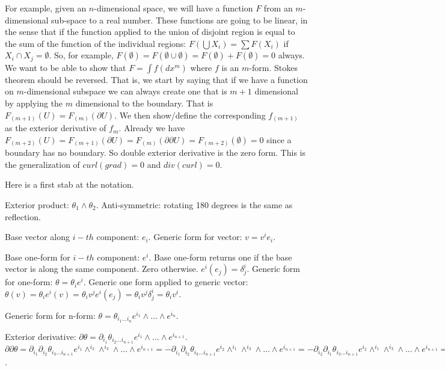 \documentclass[11pt,letterpaper,fleqn]{memoir} %
\begin{document}
For example, given an $n$-dimensional space, we will have a function $F$ from an $m$-dimensional sub-space to a real number. These functions are going to be linear, in the sense that if the function applied to the union of disjoint region is equal to the sum of the function of the individual regions: $F(\bigcup X_i) = \sum F(X_i)$ if $X_i \cap X_j = \emptyset$. So, for example, $F(\emptyset) = F(\emptyset \cup \emptyset) = F(\emptyset) + F(\emptyset) = 0$ always. We want to be able to show that $F=\int f(dx^m)$ where $f$ is an $m$-form. Stokes theorem should be reversed. That is, we start by saying that if we have a function on $m$-dimensional subspace we can always create one that is $m+1$ dimensional by applying the $m$ dimensional to the boundary. That is $F_{(m+1)}(U) = F_{(m)}(\partial U)$. We then show/define the corresponding $f_{(m+1)} $ as the exterior derivative of $f_{m}$. Already we have $F_{(m+2)}(U) = F_{(m+1)}(\partial U) = F_{(m)}(\partial \partial U) = F_{(m+2)}(\emptyset) = 0$ since a boundary has no boundary. So double exterior derivative is the zero form. This is the generalization of $curl(grad)=0$ and $div(curl)=0$. 

Here is a first stab at the notation.

Exterior product: $\theta_1 \wedge \theta_2$. Anti-symmetric: rotating 180 degrees is the same as reflection.

Base vector along $i-th$ component: $e_i$. Generic form for vector: $v = v^i e_i$.

Base one-form for $i-th$ component: $e^i$. Base one-form returns one if the base vector is along the same component. Zero otherwise. $e^i(e_j) = \delta^i_j$.  Generic form for one-form: $\theta = \theta_i e^i$. Generic one form applied to generic vector: $\theta(v) = \theta_i e^i(v) = \theta_i v^j e^i(e_j) = \theta_i v^j \delta^i_j = \theta_i v^i$.

Generic form for n-form: $\theta = \theta_{i_1...i_n}e^{i_1}\wedge ... \wedge e^{i_n}$.

Exterior derivative: $\partial \theta = \partial_{i_1} \theta_{i_2...i_{n+1}}e^{i_1}\wedge ... \wedge e^{i_{n+1}}$. $\partial \partial \theta = \partial_{i_1} \partial_{i_2} \theta_{i_3...i_{n+1}}e^{i_1}\wedge^{i_2}\wedge^{i_3}\wedge ... \wedge e^{i_{n+1}} = - \partial_{i_1} \partial_{i_2} \theta_{i_3...i_{n+1}}e^{i_2}\wedge^{i_1}\wedge^{i_3}\wedge ... \wedge e^{i_{n+1}} = - \partial_{i_2} \partial_{i_1} \theta_{i_3...i_{n+1}}e^{i_2}\wedge^{i_1}\wedge^{i_3}\wedge ... \wedge e^{i_{n+1}} = 0$.
\end{document}
